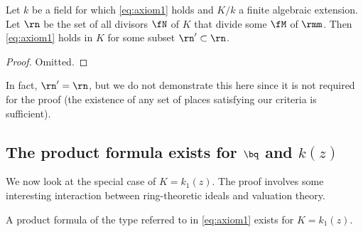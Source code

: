 \begin{lemma}
  Let $k$ be a field for which \ref{eq:axiom1} holds and $K/k$ a finite algebraic
  extension. Let $\rn$ be the set of all divisors $\fN$ of $K$ that divide some
  $\fM$ of $\rmm$. Then \ref{eq:axiom1} holds in $K$ for some subset $\rn' \subset \rn$.
\end{lemma}

\begin{proof}
  Omitted.
\end{proof}

In fact, $\rn' = \rn$, but we do not demonstrate this here since it is not
required for the proof (the existence of any set of places satisfying our
criteria is sufficient).

\subsection{The product formula exists for $\bq$ and $k(z)$}

We now look at the special case of $K = k_1(z)$. The proof involves some
interesting interaction between ring-theoretic ideals and valuation theory.

\begin{thm}
  \label{thm:ffworks}
  A product formula of the type referred to in \ref{eq:axiom1} exists for
  $K=k_1(z)$.
\end{thm}

